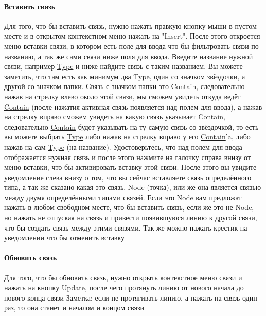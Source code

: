 \paragraph{Вставить связь}
Для того, что бы \hypertarget{DeepCase.InsertLink.Description}{вставить связь},
нужно
нажать правкую кнопку мыши в пустом
месте и в открытом контекстном меню нажать на "Insert". После этого откроется
меню вставки связи, в котором есть поле для ввода что бы фильтровать связи по
названию, а так же сами связи ниже поля для ввода. Введите название нужной
связи, например \hyperlink{Core.Type.Description}{Type} и ниже найдите связь с
таким
названием. Вы можете
заметить, что там есть как минимум два \hyperlink{Core.Type.Description}{Type},
один со
значком звёздочки, а
другой со значком папки. Связь с значком папки это
\hyperlink{Core.Contain.Description}{Contain}, следовательно нажав
на стрелку влево около этой связи, мы сможем увидеть откуда ведёт
\hyperlink{Core.Contain.Description}{Contain}
(после нажатия активная связь появляется над полем для ввода), а нажав на
стрелку вправо сможем увидеть на какую связь указывает
\hyperlink{Core.Contain.Description}{Contain}, следовательно
\hyperlink{Core.Contain.Description}{Contain} будет указывать на ту самую связь
со
звёздочкой, то есть вы можете
выбрать \hyperlink{Core.Type.Description}{Type} либо нажав на стрелку вправо у
его
\hyperlink{Core.Contain.Description}{Contain}'a, либо нажав на сам
\hyperlink{Core.Type.Description}{Type} (на название). Удостоверьтесь, что над
полем для
ввода отображается нужная
связь и после этого нажмите на галочку справа внизу от меню вставки, что бы
активировать вставку этой связи. После этого вы увидите уведомление слева внизу
о том, что вы сейчас вставляете связь определённого типа, а так же сказано
какая это связь, Node (точка), или же она является связью между двумя
определёнными типами связей. Если это Node вам предложат нажать в любом
свободном месте, что бы вставить связь, если же это не Node, но нажать не
отпуская на связь и привести появившуюся линию к другой связи, что бы создать
связь между этими связями. Так же можно нажать крестик на уведомлении что бы
отменить вставку
\paragraph{Обновить связь}
Для того, что бы обновить связь, нужно открыть контекстное меню связи и нажать
на кнопку Update, после чего протянуть линию от нового начала до нового конца
связи
Заметка: если не протягивать линию, а нажать на связь один раз, то она станет и
началом и концом связи
